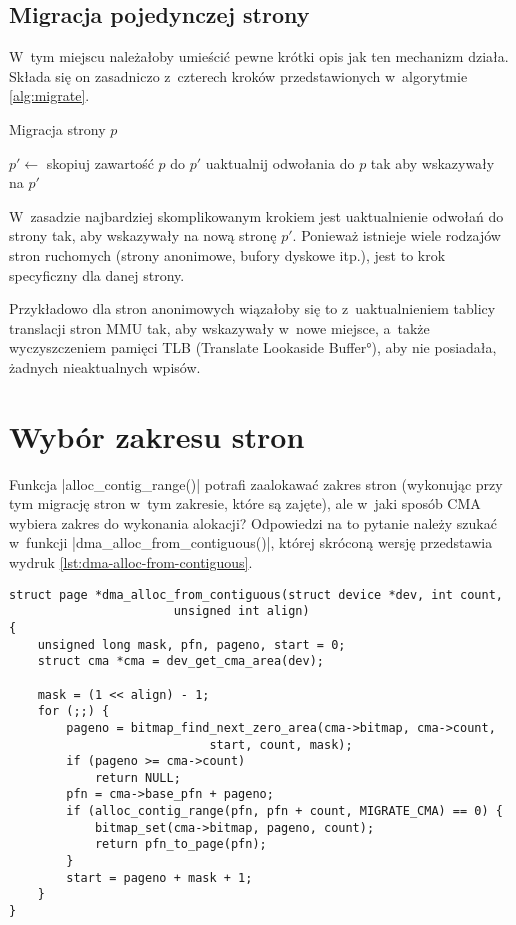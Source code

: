 \subsection{Migracja pojedynczej strony}

 W~tym miejscu należałoby umieścić pewne
krótki opis jak ten mechanizm działa.  Składa się on zasadniczo
z~czterech kroków przedstawionych w~algorytmie \ref{alg:migrate}.

\begin{algorithm}
\caption{Migracja strony $p$}
\label{alg:migrate}
\begin{algorithmic}[1]
    \State $p' \gets$ 
    \State skopiuj zawartość $p$ do $p'$
    \State uaktualnij odwołania do $p$ tak aby wskazywały na $p'$
    \State {}
\EndProcedure
\end{algorithmic}
\end{algorithm}

 W~zasadzie najbardziej skomplikowanym krokiem
jest uaktualnienie odwołań do strony tak, aby wskazywały na nową
stronę $p'$.  Ponieważ istnieje wiele rodzajów stron ruchomych (strony
anonimowe, bufory dyskowe itp.), jest to krok specyficzny dla danej
strony.

Przykładowo dla stron anonimowych wiązałoby się to z~uaktualnieniem
tablicy translacji stron MMU tak, aby wskazywały w~nowe miejsce,
a~także wyczyszczeniem pamięci TLB (\ang{Translate Lookaside Buffer}),
aby nie posiadała, żadnych nieaktualnych wpisów.


\section{Wybór zakresu stron}

Funkcja \code|alloc_contig_range()| potrafi zaalokawać zakres
stron (wykonując przy tym migrację stron w~tym zakresie, które są
zajęte), ale w~jaki sposób CMA wybiera zakres do wykonania alokacji?
Odpowiedzi na to pytanie należy szukać w~funkcji
\code|dma_alloc_from_contiguous()|, której skróconą wersję
przedstawia wydruk \ref{lst:dma-alloc-from-contiguous}.

\begin{lstlisting}[float=tbhp,caption={Skrócony wydruk funkcji
    \code|dma_alloc_from_contiguous()| z Linuksa
    3.5.},label=lst:dma-alloc-from-contiguous]
struct page *dma_alloc_from_contiguous(struct device *dev, int count,
				       unsigned int align)
{
	unsigned long mask, pfn, pageno, start = 0;
	struct cma *cma = dev_get_cma_area(dev);

	mask = (1 << align) - 1;
	for (;;) {
		pageno = bitmap_find_next_zero_area(cma->bitmap, cma->count,
						    start, count, mask);
		if (pageno >= cma->count)
			return NULL;
		pfn = cma->base_pfn + pageno;
		if (alloc_contig_range(pfn, pfn + count, MIGRATE_CMA) == 0) {
			bitmap_set(cma->bitmap, pageno, count);
			return pfn_to_page(pfn);
		}
		start = pageno + mask + 1;
	}
}
\end{lstlisting}

